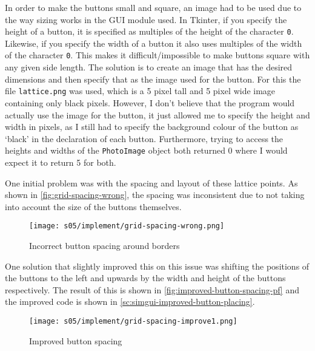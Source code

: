     In order to make the buttons small and square, an image had to be used due to the way sizing works in the GUI module used. 
    In Tkinter, if you specify the height of a button, it is specified as multiples of the height of the character \verb|0|. 
    Likewise, if you specify the width of a button it also uses multiples of the width of the character \verb|0|. 
    This makes it difficult/impossible to make buttons square with any given side length.
    The solution is to create an image that has the desired dimensions and then specify that as the image used for the button. 
    For this the file \verb|lattice.png| was used, which is a 5 pixel tall and 5 pixel wide image containing only black pixels. 
    However, I don't believe that the program would actually use the image for the button, it just allowed me to specify the height and width in pixels, as I still had to specify the background colour of the button as `black' in the declaration of each button. 
    Furthermore, trying to access the heights and widths of the \verb|PhotoImage| object both returned 0 where I would expect it to return 5 for both. 
    
    One initial problem was with the spacing and layout of these lattice points. 
    As shown in \autoref{fig:grid-spacing-wrong}, the spacing was inconsistent due to not taking into account the size of the buttons themselves. 

    \begin{figure}[!ht]
        \centering
        \texttt{[image: s05/implement/grid-spacing-wrong.png]}
        \caption{Incorrect button spacing around borders}
        \label{fig:grid-spacing-wrong}
    \end{figure}

    One solution that slightly improved this on this issue was shifting the positions of the buttons to the left and upwards by the width and height of the buttons respectively. 
    The result of this is shown in \autoref{fig:improved-button-spacing-pf} and the improved code is shown in \autoref{sc:simgui-improved-button-placing}. 

    \begin{figure}[!ht]
        \centering
        \texttt{[image: s05/implement/grid-spacing-improve1.png]}
        \caption{Improved button spacing}
        \label{fig:improved-button-spacing-pf}
    \end{figure}


